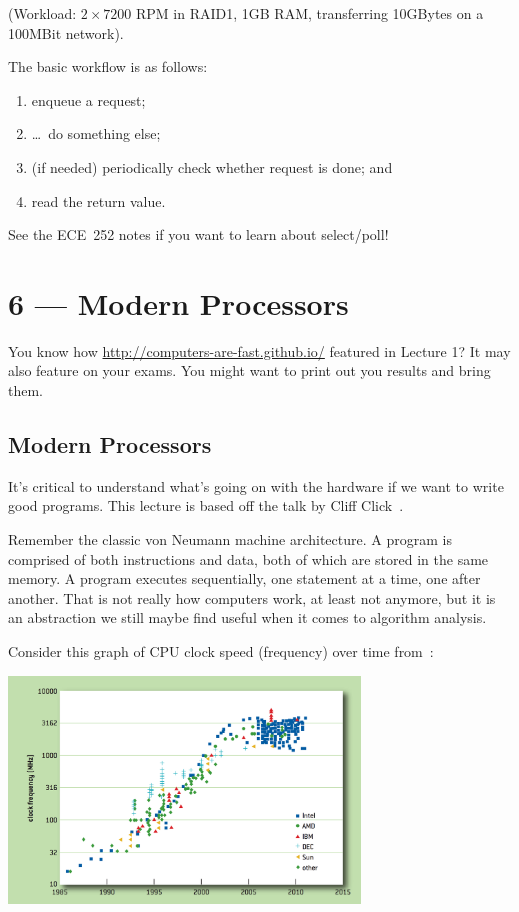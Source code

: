 \documentclass[a4paper]{report}
\begin{document}
(Workload: $2\times 7200$ RPM in RAID1, 1GB RAM, transferring 10GBytes on a 100MBit network).

The basic workflow is as follows: 
   \begin{enumerate}
     \item enqueue a request;
     \item \ldots ~do something else;
     \item (if needed) periodically check whether request is done; and
     \item read the return value.
   \end{enumerate}
   
   See the ECE~252 notes if you want to learn about select/poll!









\chapter*{6 --- Modern Processors}


You know how \url{http://computers-are-fast.github.io/} featured in Lecture 1? It may also feature on your exams. You might want to print out you results and bring them.

\section*{Modern Processors}

It's critical to understand what's going on with the hardware if we want to write good programs. This lecture is based off the talk by Cliff Click~\cite{modern-hardware}.

Remember the classic von Neumann machine architecture. A program is comprised of both instructions and data, both of which are stored in the same memory. A program executes sequentially, one statement at a time, one after another. That is not really how computers work, at least not anymore, but it is an abstraction we still maybe find useful when it comes to algorithm analysis.

Consider this graph of CPU clock speed (frequency) over time from~\cite{cpudb}:

\begin{center}
\includegraphics[width=0.7\textwidth]{images/cpu-frequency}
\end{center}
\end{document}

